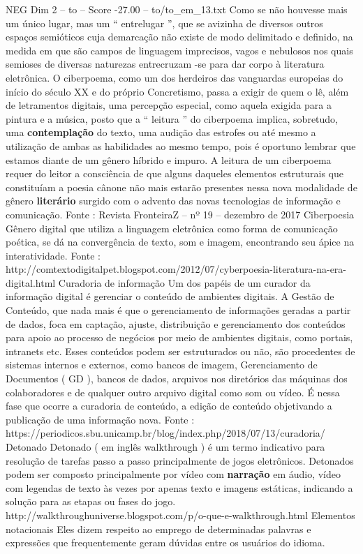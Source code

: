 \begin{textsample}{NEG Dim 2 – to – Score -27.00 – to/to\_em\_13.txt}
Como se não houvesse mais um único lugar, mas um “ entrelugar ”, que se avizinha de diversos outros espaços semióticos cuja demarcação não existe de modo delimitado e definido, na medida em que são campos de linguagem imprecisos, vagos e nebulosos nos quais semioses de diversas naturezas entrecruzam -se para dar corpo à literatura eletrônica.
O ciberpoema, como um dos herdeiros das vanguardas europeias do início do século XX e do próprio Concretismo, passa a exigir de quem o lê, além de letramentos digitais, uma percepção especial, como aquela exigida para a pintura e a música, posto que a “ leitura ” do ciberpoema implica, sobretudo, uma \textbf{contemplação} do texto, uma audição das estrofes ou até mesmo a utilização de ambas as habilidades ao mesmo tempo, pois é oportuno lembrar que estamos diante de um gênero híbrido e impuro.
A leitura de um ciberpoema requer do leitor a consciência de que alguns daqueles elementos estruturais que constituíam a poesia cânone não mais estarão presentes nessa nova modalidade de gênero \textbf{literário} surgido com o advento das novas tecnologias de informação e comunicação.
Fonte : Revista FronteiraZ – nº 19 – dezembro de 2017 Ciberpoesia Gênero digital que utiliza a linguagem eletrônica como forma de comunicação poética, se dá na convergência de texto, som e imagem, encontrando seu ápice na interatividade.
Fonte : http://comtextodigitalpet.blogspot.com/2012/07/cyberpoesia-literatura-na-era-digital.html Curadoria de informação Um dos papéis de um curador da informação digital é gerenciar o conteúdo de ambientes digitais.
A Gestão de Conteúdo, que nada mais é que o gerenciamento de informações geradas a partir de dados, foca em captação, ajuste, distribuição e gerenciamento dos conteúdos para apoio ao processo de negócios por meio de ambientes digitais, como portais, intranets etc.
Esses conteúdos podem ser estruturados ou não, são procedentes de sistemas internos e externos, como bancos de imagem, Gerenciamento de Documentos ( GD ), bancos de dados, arquivos nos diretórios das máquinas dos colaboradores e de qualquer outro arquivo digital como som ou vídeo.
É nessa fase que ocorre a curadoria de conteúdo, a edição de conteúdo objetivando a publicação de uma informação nova.
Fonte : https://periodicos.sbu.unicamp.br/blog/index.php/2018/07/13/curadoria/ Detonado Detonado ( em inglês walkthrough ) é um termo indicativo para resolução de tarefas passo a passo principalmente de jogos eletrônicos.
Detonados podem ser composto principalmente por vídeo com \textbf{narração} em áudio, vídeo com legendas de texto às vezes por apenas texto e imagens estáticas, indicando a solução para as etapas ou fases do jogo. http://walkthroughuniverse.blogspot.com/p/o-que-e-walkthrough.html Elementos notacionais Eles dizem respeito ao emprego de determinadas palavras e expressões que frequentemente geram dúvidas entre os usuários do idioma.

\end{textsample}
